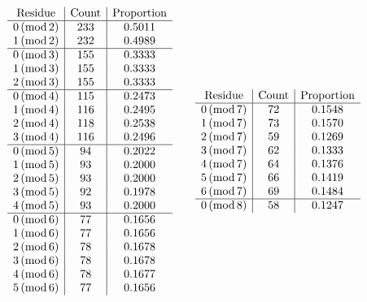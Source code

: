 \documentclass[10pt,reqno]{amsart}
\newcommand{\0}{\color{lightgray}0}
\renewcommand{\pmod}[1]{\,(\operatorname{mod} #1)}
\renewcommand\>{\rangle}
\newcommand\<{\langle}
\theoremstyle{plain}
\theoremstyle{definition}
\begin{document}
\begin{table}
\small
\begin{equation*}
\begin{array}{c|c|c}
\text{Residue} & \text{Count} & \text{Proportion}\\
\hline
0 \pmod{ 2 } &   233 &   0.5011 \\
1 \pmod{ 2 } &   232 &   0.4989 \\
\hline
0 \pmod{ 3 } &   155 &   0.3333 \\
1 \pmod{ 3 } &   155 &   0.3333 \\
2 \pmod{ 3 } &   155 &   0.3333\\
\hline
0 \pmod{ 4 } &   115 &   0.2473 \\
1 \pmod{ 4 } &   116 &   0.2495 \\
2 \pmod{ 4 } &   118 &   0.2538 \\
3 \pmod{ 4 } &   116 &   0.2496\\
\hline
0 \pmod{ 5 } &   94 &   0.2022\\
1 \pmod{ 5 } &   93 &   0.2000\\
2 \pmod{ 5 } &   93 &   0.2000\\
3 \pmod{ 5 } &   92 &   0.1978\\
4 \pmod{ 5 } &   93 &   0.2000\\
\hline
0 \pmod{ 6 } &   77 &   0.1656\\
1 \pmod{ 6 } &   77 &   0.1656\\
2 \pmod{ 6 } &   78 &   0.1678\\
3 \pmod{ 6 } &   78 &   0.1678\\
4 \pmod{ 6 } &   78 &   0.1677\\
5 \pmod{ 6 } &   77 &   0.1656\\
\end{array}
\qquad
\begin{array}{c@{}c|c|c}
\text{Residue} && \text{Count} & \text{Proportion}\\
\hline
0 \pmod{ 7 } &&   72 &   0.1548\\
1 \pmod{ 7 } &&   73 &   0.1570\\
2 \pmod{ 7 } &&   59 &   0.1269\\
3 \pmod{ 7 } &&   62 &   0.1333\\
4 \pmod{ 7 } &&   64 &   0.1376\\
5 \pmod{ 7 } &&   66 &   0.1419\\
6 \pmod{ 7 } &&   69 &   0.1484\\
\hline
0 \pmod{ 8 } &&   58 &  0.1247\\

\end{array}
\end{equation*}
\end{table}
\end{document}
